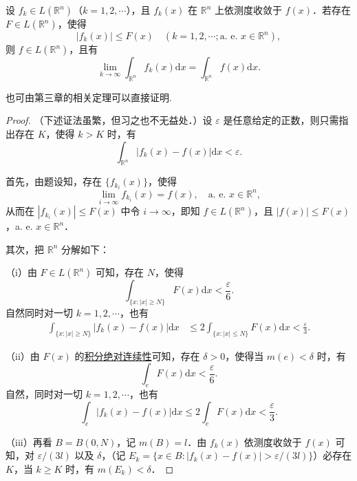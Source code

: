 \documentclass[../../main.tex]{subfiles}%
\begin{document}
\begin{theorem}[依测度收敛型控制收敛定理]\label{theorem:依测度收敛型控制收敛定理}
设 \( f_k \in L(\mathbb{R}^n) \)（\( k = 1,2,\cdots \)），且 \( f_k(x) \) 在 \( \mathbb{R}^n \) 上依测度收敛于 \( f(x) \)．若存在 \( F \in L(\mathbb{R}^n) \)，使得
\[
|f_k(x)| \leqslant F(x) \quad (k = 1,2,\cdots; \text{a. e. } x \in \mathbb{R}^n),
\]
则 \( f \in L(\mathbb{R}^n) \)，且有
\[
\lim_{k \to \infty} \int_{\mathbb{R}^n} f_k(x) \mathrm{d}x = \int_{\mathbb{R}^n} f(x) \mathrm{d}x.
\]
\end{theorem}
\begin{remark}
也可由第三章的相关定理可以直接证明.
\end{remark}
\begin{proof}

（下述证法虽繁，但习之也不无益处．）设 \( \varepsilon \) 是任意给定的正数，则只需指出存在 \( K \)，使得 \( k > K \) 时，有
\[
\int_{\mathbb{R}^n} |f_k(x) - f(x)| \mathrm{d}x < \varepsilon.
\]

首先，由题设知，存在 \( \{ f_{k_i}(x) \} \)，使得
\[
\lim_{i \to \infty} f_{k_i}(x) = f(x), \quad \text{a. e. } x \in \mathbb{R}^n,
\]
从而在 \( |f_{k_i}(x)| \leqslant F(x) \) 中令 \( i \to \infty \)，即知 \( f \in L(\mathbb{R}^n) \)，且 \( |f(x)| \leqslant F(x) \)，a. e. \( x \in \mathbb{R}^n \)．

其次，把 \( \mathbb{R}^n \) 分解如下：

（i）由 \( F \in L(\mathbb{R}^n) \) 可知，存在 \( N \)，使得
\[
\int_{\{ x : |x| \geqslant N \}} F(x) \mathrm{d}x < \frac{\varepsilon}{6}.
\]
自然同时对一切 \( k = 1,2,\cdots \)，也有
\begin{align*}
\int_{\{ x : |x| \geqslant N \}} |f_k(x) - f(x)| \mathrm{d}x &\leqslant 2 \int_{\{ x : |x| \leqslant N \}} F(x) \mathrm{d}x < \frac{\varepsilon}{3}.
\end{align*}

（ii）由 \( F(x) \) 的\hyperref[theorem:积分的绝对连续性]{积分绝对连续性}可知，存在 \( \delta > 0 \)，使得当 \( m(e) < \delta \) 时，有
\[
\int_{e} F(x) \mathrm{d}x < \frac{\varepsilon}{6}.
\]
自然，同时对一切 \( k = 1,2,\cdots \)，也有
\[
\int_{e} |f_k(x) - f(x)| \mathrm{d}x \leqslant 2 \int_{e} F(x) \mathrm{d}x < \frac{\varepsilon}{3}.
\]

（iii）再看 \( B = B(0, N) \)，记 \( m(B) = l \)．由 \( f_k(x) \) 依测度收敛于 \( f(x) \) 可知，对 \( \varepsilon/(3l) \) 以及 \( \delta \)，（记 \( E_k = \{ x \in B : |f_k(x) - f(x)| > \varepsilon/(3l) \} \)）必存在 \( K \)，当 \( k \geqslant K \) 时，有 \( m(E_k) < \delta \)．


\end{proof}
\end{document}
